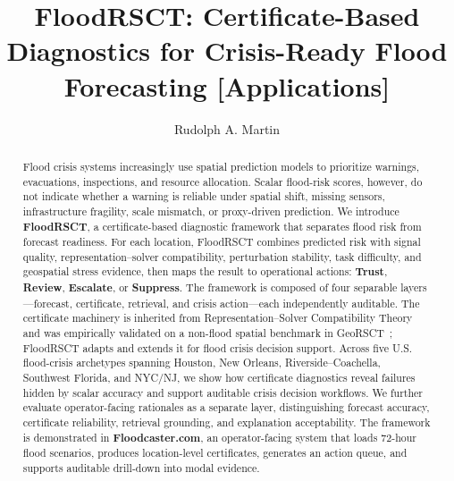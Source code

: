 \documentclass[sigconf,nonacm=true,review,authoryear]{acmart}
\title{FloodRSCT: Certificate-Based Diagnostics for Crisis-Ready Flood Forecasting [Applications]}
\author{Rudolph A. Martin}
\affiliation{%
  \institution{Next Shift Consulting LLC}
  \city{Madison}
  \state{Wisconsin}
  \country{USA}
}
\begin{document}

\begin{abstract}
Flood crisis systems increasingly use spatial prediction models to prioritize warnings, evacuations, inspections, and resource allocation. Scalar flood-risk scores, however, do not indicate whether a warning is reliable under spatial shift, missing sensors, infrastructure fragility, scale mismatch, or proxy-driven prediction. We introduce \textbf{FloodRSCT}, a certificate-based diagnostic framework that separates flood risk from forecast readiness. For each location, FloodRSCT combines predicted risk with signal quality, representation--solver compatibility, perturbation stability, task difficulty, and geospatial stress evidence, then maps the result to operational actions: \textbf{Trust}, \textbf{Review}, \textbf{Escalate}, or \textbf{Suppress}. The framework is composed of four separable layers---forecast, certificate, retrieval, and crisis action---each independently auditable. The certificate machinery is inherited from Representation--Solver Compatibility Theory~\citep{martin2026rsct} and was empirically validated on a non-flood spatial benchmark in GeoRSCT~\citep{martin2026georsct}; FloodRSCT adapts and extends it for flood crisis decision support. Across five U.S. flood-crisis archetypes spanning Houston, New Orleans, Riverside--Coachella, Southwest Florida, and NYC/NJ, we show how certificate diagnostics reveal failures hidden by scalar accuracy and support auditable crisis decision workflows. We further evaluate operator-facing rationales as a separate layer, distinguishing forecast accuracy, certificate reliability, retrieval grounding, and explanation acceptability. The framework is demonstrated in \textbf{Floodcaster.com}, an operator-facing system that loads 72-hour flood scenarios, produces location-level certificates, generates an action queue, and supports auditable drill-down into modal evidence.
\end{abstract}


\maketitle

\end{document}
